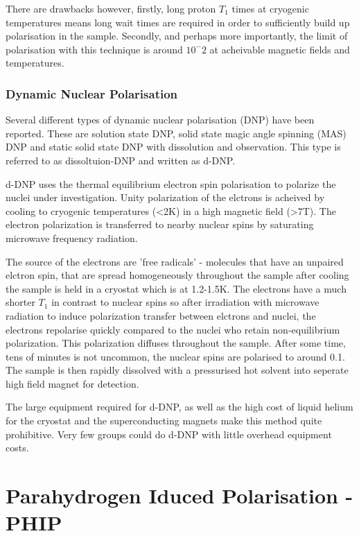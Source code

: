 There are drawbacks however, firstly, long proton $T_1$ times at cryogenic temperatures means long
wait times are required in order to sufficiently build up polarisation in the sample. Secondly, and
perhaps more importantly, the limit of polarisation with this technique is around $10^-2$ at acheivable
magnetic fields and temperatures.

\subsubsection{Dynamic Nuclear Polarisation}

Several different types of dynamic nuclear polarisation (DNP) have been reported. These are solution
state DNP\citep{RN158}, solid state magic angle spinning (MAS) DNP\citep{RN159} and static solid state DNP with
dissolution and observation\citep{RN160}. This type is referred to as dissoltuion-DNP and written as d-DNP.

d-DNP uses the thermal equilibrium electron spin polarisation to polarize the nuclei under investigation. Unity
polarization of the elctrons is acheived by cooling to cryogenic temperatures (<2K) in a high magnetic field (>7T).
The electron polarization is transferred to nearby nuclear spins by saturating microwave frequency radiation.

 The source of the electrons are 'free radicals' - molecules that have an unpaired elctron spin, that
 are spread homogeneously throughout the sample after cooling the sample is held in a cryostat which is at
 1.2-1.5K. The electrons have a much shorter $T_1$ in contrast to nuclear spins so after irradiation with
 microwave radiation to induce polarization transfer between elctrons and nuclei, the electrons repolarise
 quickly compared to the nuclei who retain non-equilibrium polarization. This polarization diffuses throughout the
 sample. After some time, tens of minutes is not uncommon, the nuclear spins are polarised to around 0.1. The
 sample is then rapidly dissolved with a pressurised hot solvent into seperate high field magnet for detection.

 The large equipment required for d-DNP, as well as the high cost of liquid helium for the cryostat and
 the superconducting magnets make this method quite prohibitive. Very few groups could do d-DNP with little
 overhead equipment costs.

\section{Parahydrogen Iduced Polarisation - PHIP}

